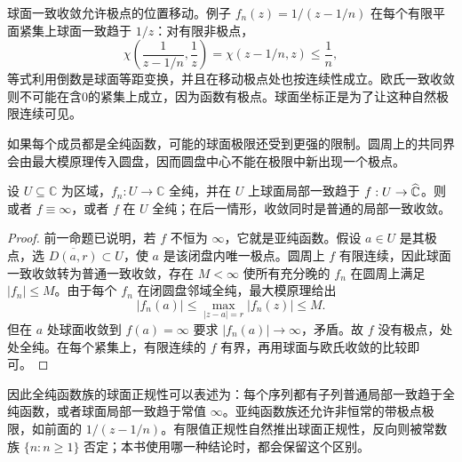 \ProseParagraphBreak

球面一致收敛允许极点的位置移动。例子 \(f_n(z)=1/(z-1/n)\) 在每个有限平面紧集上球面一致趋于 \(1/z\)：对有限非极点，
\[
 \chi\left(\frac1{z-1/n},\frac1z\right)
 =\chi(z-1/n,z)\le\frac1n,
\]
等式利用倒数是球面等距变换，并且在移动极点处也按连续性成立。欧氏一致收敛则不可能在含0的紧集上成立，因为函数有极点。球面坐标正是为了让这种自然极限连续可见。

\ProseParagraphBreak

如果每个成员都是全纯函数，可能的球面极限还受到更强的限制。圆周上的共同界会由最大模原理传入圆盘，因而圆盘中心不能在极限中新出现一个极点。

\begin{corollary}\label{b3:cor:04-holomorphic-spherical-limit}
设 \(U\subseteq\mathbb C\) 为区域，\(f_n:U\to\mathbb C\) 全纯，并在 \(U\) 上球面局部一致趋于 \(f:U\to\widehat{\mathbb C\kern0pt}\)。则或者 \(f\equiv\infty\)，或者 \(f\) 在 \(U\) 全纯；在后一情形，收敛同时是普通的局部一致收敛。
\end{corollary}
\begin{proof}
前一命题已说明，若 \(f\) 不恒为 \(\infty\)，它就是亚纯函数。假设 \(a\in U\) 是其极点，选 \(\overline{D(a,r)}\subset U\)，使 \(a\) 是该闭盘内唯一极点。圆周上 \(f\) 有限连续，因此球面一致收敛转为普通一致收敛，存在 \(M<\infty\) 使所有充分晚的 \(f_n\) 在圆周上满足 \(|f_n|\le M\)。由于每个 \(f_n\) 在闭圆盘邻域全纯，最大模原理给出
\[
 |f_n(a)|\le\max_{|z-a|=r}|f_n(z)|\le M.
\]
但在 \(a\) 处球面收敛到 \(f(a)=\infty\) 要求 \(|f_n(a)|\to\infty\)，矛盾。故 \(f\) 没有极点，处处全纯。在每个紧集上，有限连续的 \(f\) 有界，再用球面与欧氏收敛的比较即可。
\end{proof}

因此全纯函数族的球面正规性可以表述为：每个序列都有子列普通局部一致趋于全纯函数，或者球面局部一致趋于常值 \(\infty\)。亚纯函数族还允许非恒常的带极点极限，如前面的 \(1/(z-1/n)\)。有限值正规性自然推出球面正规性，反向则被常数族 \(\{n:n\ge1\}\) 否定；本书使用哪一种结论时，都会保留这个区别。
